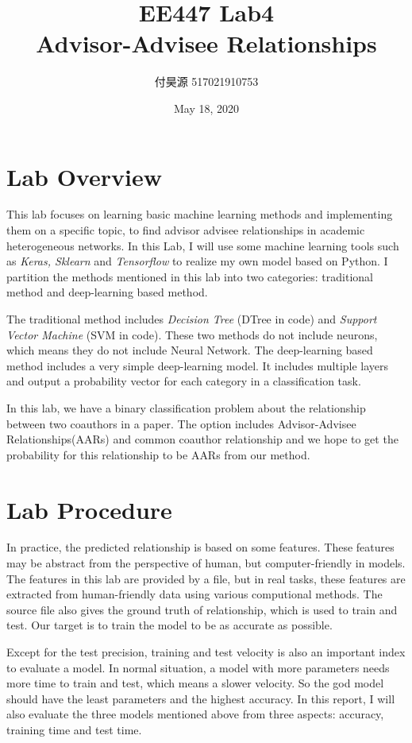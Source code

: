 \documentclass{article}
\title{\textbf{EE447 Lab4 \\ Advisor-Advisee Relationships}}
\author{付昊源 517021910753}
\date{May 18, 2020}
\begin{document}
\maketitle

\section{Lab Overview}
This lab focuses on learning basic machine learning methods and implementing them on a specific topic, to find advisor advisee relationships in academic heterogeneous networks. In this Lab, I will use some machine learning tools such as \textit{Keras, Sklearn} and \textit{Tensorflow} to realize my own model based on Python. I partition the methods mentioned in this lab into two categories: traditional method and deep-learning based method.

The traditional method includes \textit{Decision Tree} (DTree in code) and \textit{Support Vector Machine} (SVM in code). These two methods do not include neurons, which means they do not include Neural Network. The deep-learning based method includes a very simple deep-learning model. It includes multiple layers and output a probability vector for each category in a classification task.

In this lab, we have a binary classification problem about the relationship between two coauthors in a paper. The option includes Advisor-Advisee Relationships(AARs) and common coauthor relationship and we hope to get the probability for this relationship to be AARs from our method.

\section{Lab Procedure}
In practice, the predicted relationship is based on some features. These features may be abstract from the perspective of human, but computer-friendly in models. The features in this lab are provided by a file, but in real tasks, these features are extracted from human-friendly data using various computional methods. The source file also gives the ground truth of relationship, which is used to train and test. Our target is to train the model to be as accurate as possible.

Except for the test precision, training and test velocity is also an important index to evaluate a model. In normal situation, a model with more parameters needs more time to train and test, which means a slower velocity. So the god model should have the least parameters and the highest accuracy. In this report, I will also evaluate the three models mentioned above from three aspects: accuracy, training time and test time.
\end{document}
